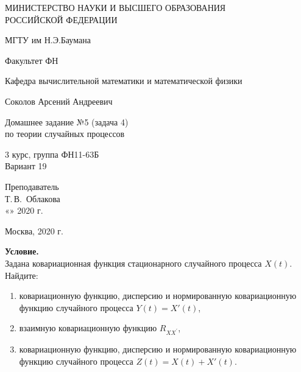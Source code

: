 \documentclass[12 pt]{article}
\begin{document}
\begin{titlepage}
	\begin{center}
		\large
		МИНИСТЕРСТВО НАУКИ И ВЫСШЕГО ОБРАЗОВАНИЯ\\ РОССИЙСКОЙ ФЕДЕРАЦИИ
		
		\vspace{0.5cm}
		
		МГТУ им Н.Э.Баумана
		\vspace{0.25cm}
		
		Факультет ФН
		
		Кафедра вычислительной математики и математической физики
		\vfill
		
		
		Соколов Арсений Андреевич\\
		\vfill
		
		
		{\LARGE Домашнее задание №5 (задача 4) \\ по теории случайных процессов\\[2mm]
		}
		\bigskip
		
		3 курс, группа ФН11-63Б\\
		Вариант 19
	\end{center}
	\vfill
	
	\newlength{\ML}
	\hfill\begin{minipage}{0.4\textwidth}
		Преподаватель\\
		\underline{\hspace{3cm}} Т.\,В.~Облакова\\
		«\underline{\hspace{0.7cm}}» \underline{\hspace{1.71cm}} 2020 г.
	\end{minipage}%
	\bigskip
	
	
	\vfill
	
	\begin{center}
		Москва, 2020 г.
	\end{center}
\end{titlepage}
	
\textbf{Условие.}\\
Задана ковариационная функция стационарного случайного процесса $X(t)$. Найдите:
\begin{enumerate}
	\item ковариационную функцию, дисперсию и нормированную	ковариационную функцию случайного процесса $Y(t) = X'(t)$,
	\item взаимную ковариационную функцию $R_{X X^{\prime}}$,
	\item ковариационную функцию, дисперсию и нормированную	ковариационную функцию случайного процесса $Z(t) = X(t) + X'(t)$.
\end{enumerate}
	
\end{document}
